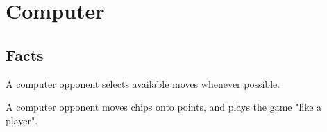 \section{Computer}

\subsection{Facts}

\begin{dashed}
    \item A computer opponent selects available moves whenever possible.
    \item A computer opponent moves chips onto points, and plays
    the game "like a player".
\end{dashed}


